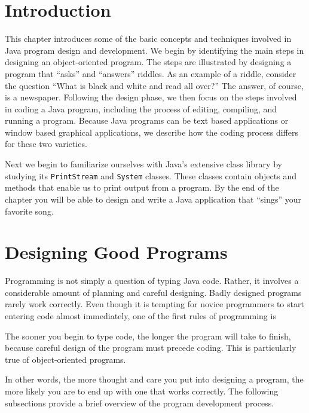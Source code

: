 \section{Introduction}
\label{introduction}

\noindent This chapter  introduces some of the basic 
concepts and techniques involved in Java program design and
development.  We begin by identifying the main steps in designing an
object-oriented program. The steps are illustrated by designing a
program that ``asks'' and ``answers'' riddles. As an example of a
riddle, consider the question ``What is black and white and read all
over?''  The answer, of course, is a newspaper.  Following the design
phase, we then focus on the steps involved in coding a Java program,
including the process of editing, compiling, and running a
program. Because Java programs can be text based applications or
window based graphical applications, we describe how the coding process differs for these two
varieties.

Next we begin to familiarize ourselves with Java's extensive class
library by studying its {\tt PrintStream} and {\tt System}
classes.  These classes contain objects and methods that enable us to
print output from a program.  By the end of the chapter you will be
able to design and write a Java application that ``sings'' your
favorite song. 

\section{Designing Good Programs}
\label{designing-good-programs}

\noindent Programming is not simply a question of typing Java code.
Rather, it involves a considerable amount of planning and careful
designing.  Badly designed programs rarely work correctly.  Even
though it is tempting for novice programmers to start entering code
almost immediately, one of the first rules of programming is

%
{The sooner you begin to type code, the longer the program will take to
finish, because careful design of the program must precede
coding. This is particularly true of object-oriented programs.}

\noindent In other words, the more thought and care you put into
designing a program, the more likely you are to end up with one
that works correctly.  The following subsections provide a brief overview
of the program development process.


